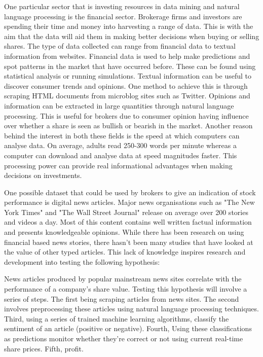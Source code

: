 \documentclass[a4paper,11pt]{report}
\begin{document}
One particular sector that is investing resources in data mining and natural language processing is the financial sector. Brokerage firms and investors are spending their time and money into harvesting a range of data. This is with the aim that the data will aid them in making better decisions when buying or selling shares.  The type of data collected can range from financial data to textual information from websites. Financial data is used to help make predictions and spot patterns in the market that have occurred before. These can be found using statistical analysis or running simulations. Textual information can be useful to discover consumer trends and opinions. One method to achieve this is through scraping HTML documents from microblog sites such as Twitter. Opinions and information can be extracted in large quantities through natural language processing. This is useful for brokers due to consumer opinion having influence over whether a share is seen as bullish or bearish in the market. Another reason behind the interest in both these fields is the speed at which computers can analyse data. On average, adults read 250-300 words per minute whereas a computer can download and analyse data at speed magnitudes faster. This processing power can provide real informational advantages when making decisions on investments.

One possible dataset that could be used by brokers to give an indication of stock performance is digital news articles. Major news organisations such as "The New York Times" and "The Wall Street Journal" release on average over 200 stories and videos a day. Most of this content contains well written factual information and presents knowledgeable opinions. While there has been research on using financial based news stories, there hasn't been many studies that have looked at the value of other typed articles. This lack of knowledge inspires research and development into testing the following hypothesis:


News articles produced by popular mainstream news sites correlate with the performance of a company's share value. Testing this hypothesis will involve a series of steps. The first being scraping articles from news sites. The second involves preprocessing these articles using natural language processing techniques. Third, using a series of trained machine learning algorithms, classify the sentiment of an article (positive or negative). Fourth, Using these classifications as predictions monitor whether they're correct or not using current real-time share prices. Fifth, profit.
\end{document}
